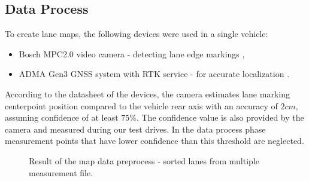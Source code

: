 \documentclass[sn-mathphys-num]{sn-jnl}%
\begin{document}
\subsection{Data Process}
To create lane maps, the following devices were used in a single vehicle:
\begin{itemize}
    \item Bosch MPC2.0 video camera - detecting lane edge markings \cite{mpc25},
    \item ADMA Gen3 GNSS system with RTK service - for accurate localization \cite{adma}.
\end{itemize}
According to the datasheet of the devices, the camera estimates lane marking centerpoint position compared to the vehicle rear axis with an accuracy of $2 cm$, 
assuming confidence of at least $75\%$. The confidence value is also provided by the camera and measured during our test drives. In the data process phase 
measurement points that have lower confidence than this threshold are neglected.
\begin{figure}[h]
    \caption{Result of the map data preprocess - sorted lanes from multiple measurement file.}
    \label{fig:ZZ_all}
\end{figure}
\end{document}
